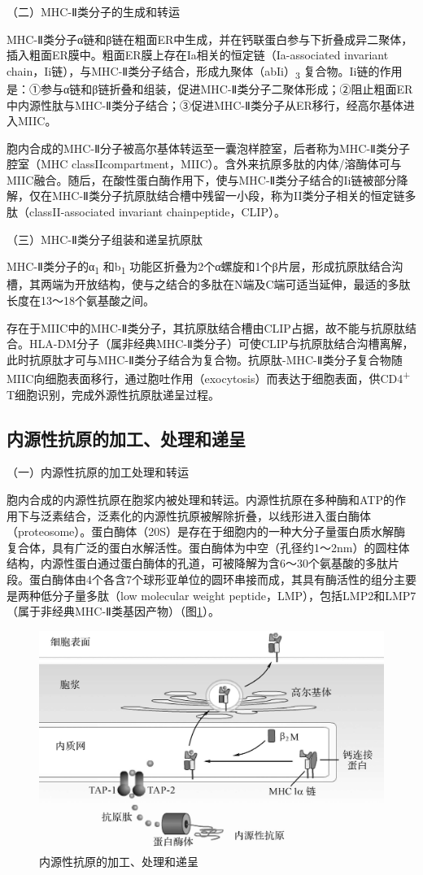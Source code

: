 （二）MHC-Ⅱ类分子的生成和转运

MHC-Ⅱ类分子α链和β链在粗面ER中生成，并在钙联蛋白参与下折叠成异二聚体，插入粗面ER膜中。粗面ER膜上存在Ia相关的恒定链（Ia-associated
invariant
chain，Ii链），与MHC-Ⅱ类分子结合，形成九聚体（abIi）\textsubscript{3}
复合物。Ii链的作用是：①参与α链和β链折叠和组装，促进MHC-Ⅱ类分子二聚体形成；②阻止粗面ER中内源性肽与MHC-Ⅱ类分子结合；③促进MHC-Ⅱ类分子从ER移行，经高尔基体进入MIIC。

胞内合成的MHC-Ⅱ分子被高尔基体转运至一囊泡样腔室，后者称为MHC-Ⅱ类分子腔室（MHC
classIIcompartment，MIIC）。含外来抗原多肽的内体/溶酶体可与MIIC融合。随后，在酸性蛋白酶作用下，使与MHC-Ⅱ类分子结合的Ii链被部分降解，仅在MHC-Ⅱ类分子抗原肽结合槽中残留一小段，称为II类分子相关的恒定链多肽（classII-associated
invariant chainpeptide，CLIP）。

（三）MHC-Ⅱ类分子组装和递呈抗原肽

MHC-Ⅱ类分子的α\textsubscript{1} 和b\textsubscript{1}
功能区折叠为2个α螺旋和1个β片层，形成抗原肽结合沟槽，其两端为开放结构，使与之结合的多肽在N端及C端可适当延伸，最适的多肽长度在13～18个氨基酸之间。

存在于MIIC中的MHC-Ⅱ类分子，其抗原肽结合槽由CLIP占据，故不能与抗原肽结合。HLA-DM分子（属非经典MHC-Ⅱ类分子）可使CLIP与抗原肽结合沟槽离解，此时抗原肽才可与MHC-Ⅱ类分子结合为复合物。抗原肽-MHC-Ⅱ类分子复合物随MIIC向细胞表面移行，通过胞吐作用（exocytosis）而表达于细胞表面，供CD4\textsuperscript{+}
T细胞识别，完成外源性抗原肽递呈过程。


\subsection{内源性抗原的加工、处理和递呈}

（一）内源性抗原的加工处理和转运

胞内合成的内源性抗原在胞浆内被处理和转运。内源性抗原在多种酶和ATP的作用下与泛素结合，泛素化的内源性抗原被解除折叠，以线形进入蛋白酶体（proteosome）。蛋白酶体（20S）是存在于细胞内的一种大分子量蛋白质水解酶复合体，具有广泛的蛋白水解活性。蛋白酶体为中空（孔径约1～2nm）的圆柱体结构，内源性蛋白通过蛋白酶体的孔道，可被降解为含6～30个氨基酸的多肽片段。蛋白酶体由4个各含7个球形亚单位的圆环串接而成，其具有酶活性的组分主要是两种低分子量多肽（low
molecular weight
peptide，LMP），包括LMP2和LMP7（属于非经典MHC-Ⅱ类基因产物）（图\ref{fig9-8}）。

\begin{figure}[!htbp]
 \centering
 \includegraphics[width=.6\textwidth]{./images/Image00134.jpg}
 \captionsetup{justification=centering}
 \caption{内源性抗原的加工、处理和递呈}
 \label{fig9-8}
  \end{figure} 

